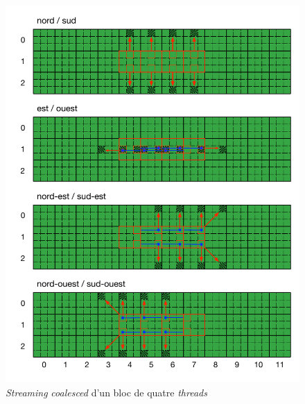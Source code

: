 \begin{figure}[h]
	\centering
	\includegraphics[fbox,scale=1.05]{images/streaming/sailfish_hist_aligned.pdf}
	\caption{\textit{Streaming} \textit{coalesced} d'un bloc de quatre \textit{threads}}
	\label{fig:sailfish_hist_aligned}
\end{figure}

